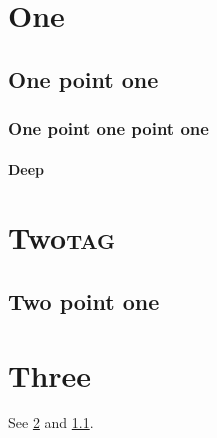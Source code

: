 \documentclass[11pt]{article}
\date{\today}
\title{}
\begin{document}
\setcounter{tocdepth}{2}
\tableofcontents

\section{One}
\label{sec:org1f85fd9}
\subsection{One point one}
\label{sec:org47118c0}
\subsubsection*{One point one point one}
\label{sec:orgaf3ed89}
\paragraph*{Deep}
\label{sec:org1c59b52}
\section*{Two\hfill{}\textsc{tag}}
\label{sec:org3028fdc}
\subsection*{Two point one}
\label{sec:org0e4d337}
\section{Three}
\label{sec:org0af2b60}
See \ref{sec:org0af2b60} and \ref{sec:org47118c0}.
\end{document}
